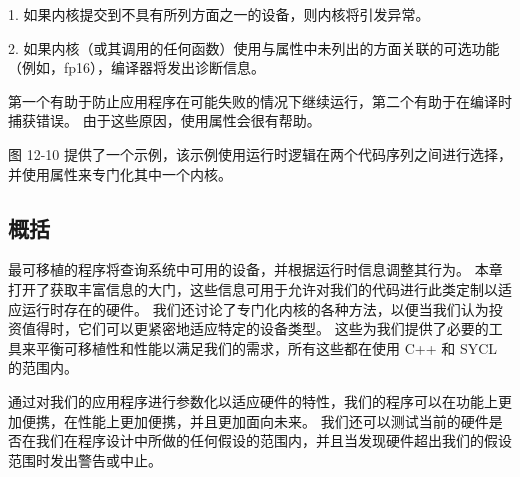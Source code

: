 1. 如果内核提交到不具有所列方面之一的设备，则内核将引发异常。

2. 如果内核（或其调用的任何函数）使用与属性中未列出的方面关联的可选功能（例如，fp16），编译器将发出诊断信息。

第一个有助于防止应用程序在可能失败的情况下继续运行，第二个有助于在编译时捕获错误。 由于这些原因，使用属性会很有帮助。

图 12-10 提供了一个示例，该示例使用运行时逻辑在两个代码序列之间进行选择，并使用属性来专门化其中一个内核。

\subsection{概括}
最可移植的程序将查询系统中可用的设备，并根据运行时信息调整其行为。 本章打开了获取丰富信息的大门，这些信息可用于允许对我们的代码进行此类定制以适应运行时存在的硬件。 我们还讨论了专门化内核的各种方法，以便当我们认为投资值得时，它们可以更紧密地适应特定的设备类型。 这些为我们提供了必要的工具来平衡可移植性和性能以满足我们的需求，所有这些都在使用 C++ 和 SYCL 的范围内。

通过对我们的应用程序进行参数化以适应硬件的特性，我们的程序可以在功能上更加便携，在性能上更加便携，并且更加面向未来。 我们还可以测试当前的硬件是否在我们在程序设计中所做的任何假设的范围内，并且当发现硬件超出我们的假设范围时发出警告或中止。

